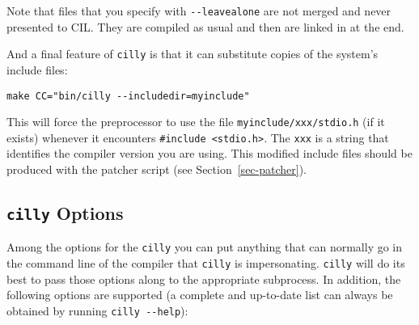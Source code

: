 \documentclass[letterpaper]{article}
\def\secref#1{Section~\ref{sec-#1}}
\def\t#1{{\tt #1}}
\begin{document}
 Note that files that you specify with \t{-{}-leavealone} are not merged and
never presented to CIL. They are compiled as usual and then are linked in at
the end. 

 And a final feature of \t{cilly} is that it can substitute copies of the
system's include files:

\begin{verbatim}
make CC="bin/cilly --includedir=myinclude"
\end{verbatim}

 This will force the preprocessor to use the file \t{myinclude/xxx/stdio.h}
(if it exists) whenever it encounters \t{\#include <stdio.h>}. The \t{xxx} is
a string that identifies the compiler version you are using. This modified
include files should be produced with the patcher script (see
\secref{patcher}).

  \subsection{\t{cilly} Options}

 Among the options for the \t{cilly} you can put anything that can normally
go in the command line of the compiler that \t{cilly} is impersonating.
\t{cilly} will do its best to pass those options along to the appropriate
subprocess. In addition, the following options are supported (a complete and
up-to-date list can always be obtained by running \t{cilly -{}-help}):
\end{document}
